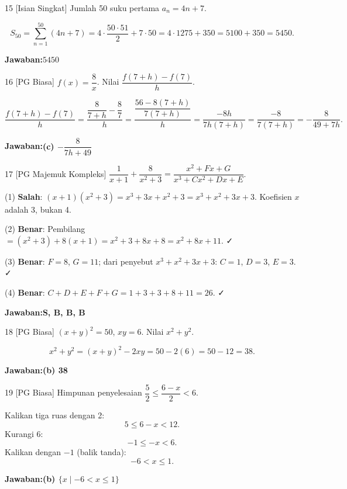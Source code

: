 \documentclass[11pt]{article}
\newcommand{\jawaban}[1]{\textbf{Jawaban:}\enspace\colorbox{gold!30}{\textbf{#1}}}
\begin{document}
\begin{soal}{15 \normalfont\small[Isian Singkat]}
Jumlah 50 suku pertama $a_n=4n+7$.
\end{soal}
\begin{pembox}
\[
S_{50}=\sum_{n=1}^{50}(4n+7)=4\cdot\frac{50\cdot51}{2}+7\cdot50=4\cdot1275+350=5100+350=5450.
\]

\jawaban{$5450$}
\end{pembox}

\begin{soal}{16 \normalfont\small[PG Biasa]}
$f(x)=\dfrac{8}{x}$. Nilai $\dfrac{f(7+h)-f(7)}{h}$.
\end{soal}
\begin{pembox}
\[
\frac{f(7+h)-f(7)}{h}=\frac{\dfrac{8}{7+h}-\dfrac{8}{7}}{h}
=\frac{\dfrac{56-8(7+h)}{7(7+h)}}{h}
=\frac{-8h}{7h(7+h)}
=\frac{-8}{7(7+h)}
=-\frac{8}{49+7h}.
\]

\jawaban{(c) $-\dfrac{8}{7h+49}$}
\end{pembox}

\begin{soal}{17 \normalfont\small[PG Majemuk Kompleks]}
$\dfrac{1}{x+1}+\dfrac{8}{x^2+3}=\dfrac{x^2+Fx+G}{x^3+Cx^2+Dx+E}$.
\end{soal}
\begin{pembox}
(1) \textbf{Salah}: $(x+1)(x^2+3)=x^3+3x+x^2+3=x^3+x^2+3x+3$. Koefisien $x$ adalah 3, bukan 4.

(2) \textbf{Benar}: Pembilang $=(x^2+3)+8(x+1)=x^2+3+8x+8=x^2+8x+11$. ✓

(3) \textbf{Benar}: $F=8$, $G=11$; dari penyebut $x^3+x^2+3x+3$: $C=1$, $D=3$, $E=3$. ✓

(4) \textbf{Benar}: $C+D+E+F+G=1+3+3+8+11=26$. ✓

\jawaban{S, B, B, B}
\end{pembox}

\begin{soal}{18 \normalfont\small[PG Biasa]}
$(x+y)^2=50$, $xy=6$. Nilai $x^2+y^2$.
\end{soal}
\begin{pembox}
\[
x^2+y^2=(x+y)^2-2xy=50-2(6)=50-12=38.
\]

\jawaban{(b) 38}
\end{pembox}

\begin{soal}{19 \normalfont\small[PG Biasa]}
Himpunan penyelesaian $\dfrac{5}{2}\leq\dfrac{6-x}{2}<6$.
\end{soal}
\begin{pembox}
Kalikan tiga ruas dengan 2:
\[
5\leq 6-x<12.
\]
Kurangi 6:
\[
-1\leq -x<6.
\]
Kalikan dengan $-1$ (balik tanda):
\[
-6<x\leq1.
\]

\jawaban{(b) $\{x\mid-6<x\leq1\}$}
\end{pembox}
\end{document}
